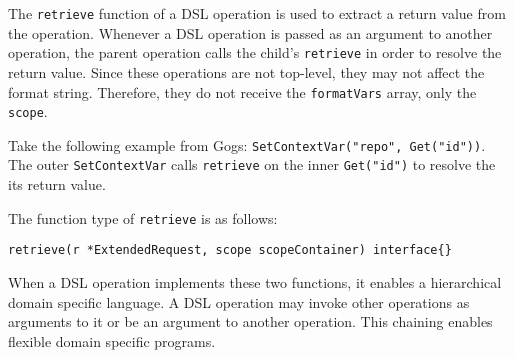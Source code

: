 The \lstinline{retrieve} function of a DSL operation is used to extract a return value from the operation. Whenever a DSL operation is passed as an argument to another operation, the parent operation calls the child's \lstinline{retrieve} in order to resolve the return value. Since these operations are not top-level, they may not affect the format string. Therefore, they do not receive the \lstinline{formatVars} array, only the \lstinline{scope}.

Take the following example from Gogs: \lstinline{SetContextVar("repo", Get("id"))}. The outer \lstinline{SetContextVar} calls \lstinline{retrieve} on the inner \lstinline{Get("id")} to resolve the its return value.



The function type of \lstinline{retrieve} is as follows:

\begin{lstlisting}[float=h]
retrieve(r *ExtendedRequest, scope scopeContainer) interface{}
\end{lstlisting}

When a DSL operation implements these two functions, it enables a hierarchical domain specific language. A DSL operation may invoke other operations as arguments to it or be an argument to another operation. This chaining enables flexible domain specific programs.


